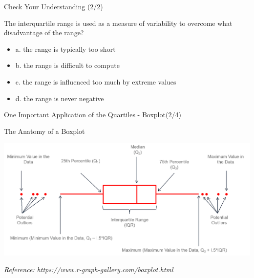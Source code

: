 \documentclass{beamer}
\begin{document}
\begin{frame}{Check Your Understanding (2/2)}

The interquartile range is used as a measure of variability to overcome what disadvantage of the range?

\begin{itemize}
\item a.	the range is typically too short
\item b.	the range is difficult to compute
\item c.	the range is influenced too much by extreme values
\item d.	the range is never negative
\end{itemize}

\end{frame}



\begin{frame}{One Important Application of the Quartiles - Boxplot(2/4)}

\begin{center}
The Anatomy of a Boxplot
\vspace{0.3cm                                                                                                                                                                                                                               }

\includegraphics[scale=0.31]{images/ch2BoxPlotAnatomy.png}
\end{center}

\begin{flushright}
\begin{scriptsize}
\textit{Reference: https://www.r-graph-gallery.com/boxplot.html
}\end{scriptsize}
\end{flushright}

\end{frame}
\end{document}
